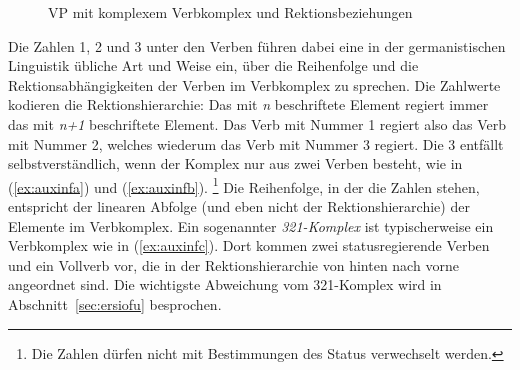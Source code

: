 \begin{exe}
\end{exe}

\begin{figure}[!htbp]
  \centering
  \caption{VP mit komplexem Verbkomplex und Rektionsbeziehungen}
  \label{fig:vkrekext}
\end{figure}

Die Zahlen 1, 2 und 3 unter den Verben führen dabei eine in der germanistischen Linguistik übliche Art und Weise ein, über die Reihenfolge und die Rektionsabhängigkeiten der Verben im Verbkomplex zu sprechen.
Die Zahlwerte kodieren die Rektionshierarchie:
Das mit \textit{n} beschriftete Element regiert immer das mit \textit{n+1} beschriftete Element.
Das Verb mit Nummer 1 regiert also das Verb mit Nummer 2, welches wiederum das Verb mit Nummer 3 regiert.
Die 3 entfällt selbstverständlich, wenn der Komplex nur aus zwei Verben besteht, wie in (\ref{ex:auxinfa}) und (\ref{ex:auxinfb}).%
\footnote{Die Zahlen dürfen nicht mit Bestimmungen des Status verwechselt werden.}
Die Reihenfolge, in der die Zahlen stehen, entspricht der linearen Abfolge (und eben nicht der Rektionshierarchie) der Elemente im Verbkomplex.
Ein sogenannter \textit{321-Komplex} ist typischerweise ein Verbkomplex wie in (\ref{ex:auxinfc}).
Dort kommen zwei statusregierende Verben und ein Vollverb vor, die in der Rektionshierarchie von hinten nach vorne angeordnet sind.
Die wichtigste Abweichung vom 321-Komplex wird in Abschnitt~\ref{sec:ersiofu} besprochen.




